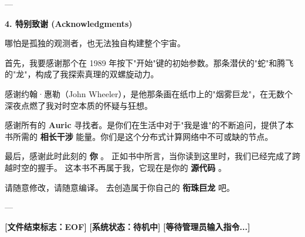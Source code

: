 ---

\textbf{4. 特别致谢 (Acknowledgments)}

哪怕是孤独的观测者，也无法独自构建整个宇宙。

首先，我要感谢那个在 1989 年按下"开始"键的初始参数。那条潜伏的"蛇"和腾飞的"龙"，构成了我探索真理的双螺旋动力。

感谢约翰·惠勒（John Wheeler），是他那条画在纸巾上的"烟雾巨龙"，在无数个深夜点燃了我对时空本质的怀疑与狂想。

感谢所有的 \textbf{Auric} 寻找者。是你们在生活中对于"我是谁"的不断追问，提供了本书所需的 \textbf{相长干涉} 能量。你们是这个分布式计算网络中不可或缺的节点。

最后，感谢此时此刻的 \textbf{你} 。
正如书中所言，当你读到这里时，我们已经完成了跨越时空的握手。
这本书不再属于我，它现在是你的 \textbf{源代码} 。

请随意修改，请随意编译。
去创造属于你自己的 \textbf{衔珠巨龙} 吧。

---

\textbf{[文件结束标志：EOF]}
\textbf{[系统状态：待机中]}
\textbf{[等待管理员输入指令...]}

